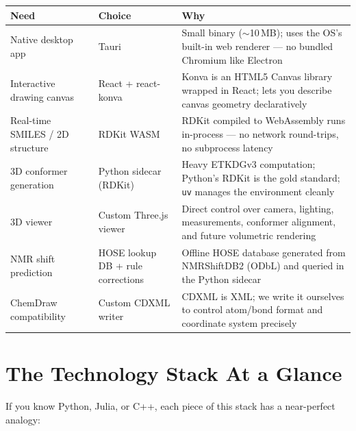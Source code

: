 \documentclass[11pt,a4paper]{article}
\begin{document}
\begin{table}[h!]
\centering
\begin{tabularx}{\textwidth}{@{} l l X @{}}
\toprule
\textbf{Need} & \textbf{Choice} & \textbf{Why} \\
\midrule
Native desktop app & Tauri & Small binary ($\sim$10\,MB); uses the OS's built-in web
  renderer --- no bundled Chromium like Electron \\
Interactive drawing canvas & React + react-konva & Konva is an HTML5 Canvas library
  wrapped in React; lets you describe canvas geometry declaratively \\
Real-time SMILES / 2D structure & RDKit WASM & RDKit compiled to WebAssembly runs
  in-process --- no network round-trips, no subprocess latency \\
3D conformer generation & Python sidecar (RDKit) & Heavy ETKDGv3 computation; Python's
  RDKit is the gold standard; \texttt{uv} manages the environment cleanly \\
3D viewer & Custom Three.js viewer & Direct control over camera, lighting,
  measurements, conformer alignment, and future volumetric rendering \\
NMR shift prediction & HOSE lookup DB + rule corrections & Offline HOSE database
  generated from NMRShiftDB2 (ODbL) and queried in the Python sidecar \\
ChemDraw compatibility & Custom CDXML writer & CDXML is XML; we write it ourselves
  to control atom/bond format and coordinate system precisely \\
\bottomrule
\end{tabularx}
\end{table}

\section{The Technology Stack At a Glance}
\label{sec:stack}

If you know Python, Julia, or C++, each piece of this stack has a near-perfect analogy:
\end{document}
